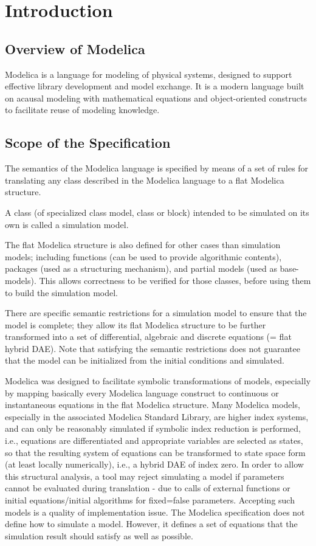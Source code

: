 \chapter{Introduction}
\section{Overview of Modelica}
Modelica is a language for modeling of physical systems, designed to
support effective library development and model exchange. It is a modern
language built on acausal modeling with mathematical equations and
object-oriented constructs to facilitate reuse of modeling knowledge.

\section{Scope of the Specification}

The semantics of the Modelica language is specified by means of a set of
rules for translating any class described in the Modelica language to a
flat Modelica structure.

A class (of specialized class model, class or block) intended to be
simulated on its own is called a simulation model.

The flat Modelica structure is also defined for other cases than
simulation models; including functions (can be used to provide
algorithmic contents), packages (used as a structuring mechanism), and
partial models (used as base-models). This allows correctness to be
verified for those classes, before using them to build the simulation
model.

There are specific semantic restrictions for a simulation model to
ensure that the model is complete; they allow its flat Modelica
structure to be further transformed into a set of differential,
algebraic and discrete equations (= flat hybrid DAE). Note that
satisfying the semantic restrictions does not guarantee that the model
can be initialized from the initial conditions and simulated.

Modelica was designed to facilitate symbolic transformations of models,
especially by mapping basically every Modelica language construct to
continuous or instantaneous equations in the flat Modelica structure.
Many Modelica models, especially in the associated Modelica Standard
Library, are higher index systems, and can only be reasonably simulated
if symbolic index reduction is performed, i.e., equations are
differentiated and appropriate variables are selected as states, so that
the resulting system of equations can be transformed to state space form
(at least locally numerically), i.e., a hybrid DAE of index zero. In
order to allow this structural analysis, a tool may reject simulating a
model if parameters cannot be evaluated during translation - due to
calls of external functions or initial equations/initial algorithms for
fixed=false parameters. Accepting such models is a quality of
implementation issue. The Modelica specification does not define how to
simulate a model. However, it defines a set of equations that the
simulation result should satisfy as well as possible.

